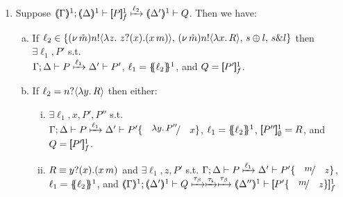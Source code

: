 \documentclass[runningheads]{llncs}
\begin{document}
{{\begin{proposition}
\begin{enumerate}[1.]
		\item	Suppose $\horel{\tmap{\Gamma}{1}}{\tmap{\Delta}{1}}{\pmapp{P}{1}{f}}{\hby{\ell_2}}{\tmap{\Delta'}{1}}{Q}$.
			Then we have:
%
			\begin{enumerate}[a)]
				\item 
					If $\ell_2 \in
					\{(\nu\, \tilde{m})n ! \langle \lambda z.\,\,z ? (x) . (x\, {m}) \rangle, \,(\nu\, \tilde{m}) n ! \langle \lambda x.\,R \rangle, \,s \oplus l, \,s \& l\}$
					then $\exists \ell_1, P'$ s.t. \\
					$\Gamma; \Delta \vdash P \xmapsto{\ell_1} \Delta' \vdash P'$, 
					$\ell_1 = \{\!\!\{\ell_2\}\!\!\}^{1}$, 
					and
					$Q = [\!\![P']\!\!]^1_f$.
			
				\item 
					If $\ell_2 = n ? \langle \lambda y.\,R \rangle$ %
					then either:
%
					\begin{enumerate}[(i)]
						\item	$\exists \ell_1, x, P', P''$ s.t. \\
							$\horel{\Gamma}{\Delta}{P}{\hby{\ell_1}}{\Delta'}{P' \subst{\abs{y}P''}{x}}$, 
							$\ell_1 = \{\!\!\{\ell_2\}\!\!\}^{1}$, $[\!\![P'']\!\!]^1_\emptyset = R$, and $Q = [\!\![P']\!\!]^1_f$.

						\item	$R \equiv y ? (x) . (x\, {m})$ and 
							$\exists \ell_1, z, P'$ s.t. 
							$\horel{\Gamma}{\Delta}{P}{\hby{\ell_1}}{\Delta'}{P' \subst{m}{z}}$, \\
							$\ell_1 = \{\!\!\{\ell_2\}\!\!\}^{1}$,
							and 
							$\horel{\tmap{\Gamma}{1}}{\tmap{\Delta'}{1}}{Q}{\hby{\btau} \hby{\stau} \hby{\btau}}{\tmap{\Delta''}{1}}{\pmapp{P'\subst{m}{z}}{1}{f}}$
					\end{enumerate}
			
%
%
		    \end{enumerate}
		    

\end{enumerate}
\end{proposition}}}
\end{document}
